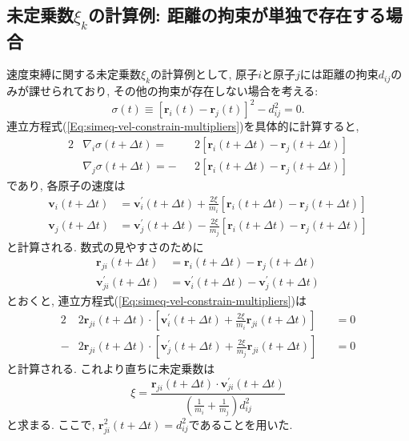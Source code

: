 \subsection{未定乗数$\xi_{k}$の計算例: 距離の拘束が単独で存在する場合}

速度束縛に関する未定乗数$\xi_{k}$の計算例として, 原子$i$と原子$j$には距離の拘束$d_{ij}$のみが課せられており, その他の拘束が存在しない場合を考える:
\begin{equation}
    \sigma(t)  \equiv [\bm{r}_{i}(t) - \bm{r}_{j}(t)]^{2} - d_{ij}^2 = 0.
\end{equation}
連立方程式(\ref{Eq:simeq-vel-constrain-multipliers})を具体的に計算すると, 
\begin{alignat}{2}
    &\nabla_{i} \sigma(t + \Delta t)
    =
    &&2\left[\bm{r}_{i}(t + \Delta t) - \bm{r}_{j} (t + \Delta t)\right]
    \\
    &\nabla_{j} \sigma(t + \Delta t)
    =
    -&&2\left[\bm{r}_{i}(t + \Delta t) - \bm{r}_{j} (t + \Delta t)\right]
\end{alignat}
であり, 各原子の速度は
\begin{align}
    \bm{v}_{i} (t + \Delta t)
    &=
    \bm{v}_{i}^{\prime} (t + \Delta t)
    +
    \frac{2\xi}{m_{i}}
    \left[\bm{r}_{i}(t + \Delta t) - \bm{r}_{j} (t + \Delta t)\right]
    \\
    \bm{v}_{j} (t + \Delta t)
    &=
    \bm{v}_{j}^{\prime} (t + \Delta t)
    -
    \frac{2\xi}{m_{j}}
    \left[\bm{r}_{i}(t + \Delta t) - \bm{r}_{j} (t + \Delta t)\right]
\end{align}
と計算される. 数式の見やすさのために
\begin{align}
    \bm{r}_{ji} (t + \Delta t)
    &=
    \bm{r}_{i}(t + \Delta t) - \bm{r}_{j} (t + \Delta t)
    \\
    \bm{v}_{ji}^{\prime} (t + \Delta t)
    &=
    \bm{v}_{i}^{\prime} (t + \Delta t) - \bm{v}_{j}^{\prime} (t + \Delta t)
\end{align}
とおくと, 連立方程式(\ref{Eq:simeq-vel-constrain-multipliers})は
\begin{alignat}{2}
    &2\bm{r}_{ji} (t + \Delta t) \cdot
    \left[
        \bm{v}_{i}^{\prime} (t + \Delta t)
        +
        \frac{2\xi}{m_{i}} \bm{r}_{ji} (t + \Delta t)
    \right]
    &&=0
    \\
    -&2\bm{r}_{ji} (t + \Delta t) \cdot
    \left[
        \bm{v}_{j}^{\prime} (t + \Delta t)
        +
        \frac{2\xi}{m_{j}} \bm{r}_{ji} (t + \Delta t)
    \right]
    &&=0
\end{alignat}
と計算される. これより直ちに未定乗数は
\begin{equation}
    \xi
    =
    \frac{\bm{r}_{ji} (t + \Delta t) \cdot \bm{v}_{ji}^{\prime} (t + \Delta t)}
    {\left( \frac{1}{m_{i}} + \frac{1}{m_{j}}\right) d_{ij}^{2}}
\end{equation}
と求まる. 
ここで, $\bm{r}_{ji}^{2} (t + \Delta t) = d_{ij}^{2}$であることを用いた. 

